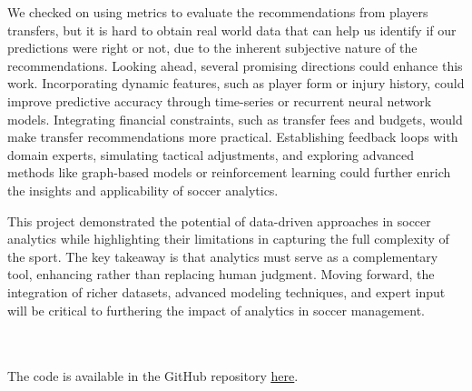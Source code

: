 \documentclass{article}
\begin{document}
We checked on using metrics to evaluate the recommendations from players transfers, but it is hard to obtain real world data that can help us identify if our predictions were right or not, due to the inherent subjective nature of the recommendations. Looking ahead, several promising directions could enhance this work. Incorporating dynamic features, such as player form or injury history, could improve predictive accuracy through time-series or recurrent neural network models. Integrating financial constraints, such as transfer fees and budgets, would make transfer recommendations more practical. Establishing feedback loops with domain experts, simulating tactical adjustments, and exploring advanced methods like graph-based models or reinforcement learning could further enrich the insights and applicability of soccer analytics.


This project demonstrated the potential of data-driven approaches in soccer analytics while highlighting their limitations in capturing the full complexity of the sport. The key takeaway is that analytics must serve as a complementary tool, enhancing rather than replacing human judgment. Moving forward, the integration of richer datasets, advanced modeling techniques, and expert input will be critical to furthering the impact of analytics in soccer management.



\printbibliography
\\~\\
The code is available in the GitHub repository \underline{\textcolor{blue}{\href{https://github.ncsu.edu/arao23/engr-ALDA-Fall2024-P28}{here}}}. 
\normalsize
\end{document}
